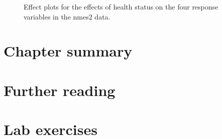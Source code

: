 \documentclass[11pt]{book}\usepackage[]{graphicx}\usepackage[]{color}
\begin{document}
\begin{figure}[htb]
  \caption{Effect plots for the effects of health status on the four response variables in the nmes2 data.}
  \label{fig:nmes-eff-health}
\end{figure}


\section{Chapter summary}


\section{Further reading}

\section{Lab exercises}
\end{document}
